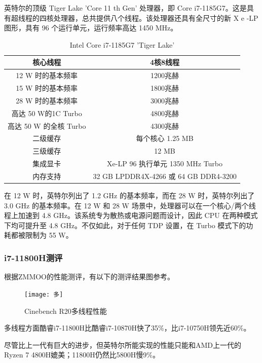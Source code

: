\documentclass[a4paper]{article}
\begin{document}
英特尔的顶级 Tiger Lake 'Core 11 th Gen' 处理器，即 Core i7-1185G7。这是具有超线程的四核处理器，总共提供八个线程。该处理器还具有全尺寸的新 X e -LP 图形，具有 96 个运行单元，运行频率高达 1450 MHz。
\begin{table}[!htbp]
\centering
\begin{tabular}{|c|c|}
\hline
核心线程& 4核8线程\\
\hline
12 W 时的基本频率& 	1200兆赫\\
\hline
15 W 时的基本频率& 	1800兆赫\\
\hline
28 W 时的基本频率& 3000兆赫\\
\hline
高达 50 W的1C Turbo & 4800兆赫\\
\hline
高达 50 W 的全核 Turbo& 4300兆赫\\
\hline
二级缓存& 每个核心 1.25 MB\\
\hline
三级缓存& 12 MB\\
\hline
集成显卡& Xe-LP
96 执行单元
1350 MHz Turbo\\
\hline
内存支持& 32 GB LPDDR4X-4266
或
64 GB DDR4-3200\\
\hline
\end{tabular}
\caption{Intel Core i7-1185G7 'Tiger Lake'}
\end{table}

在 12 W 时，英特尔列出了 1.2 GHz 的基本频率，而在 28 W 时，英特尔列出了 3.0 GHz 的基本频率。在 12 W 和 28 W 场景中，处理器可以在一个核心/两个线程上加速到 4.8 GHz。该系统专为散热或电源问题而设计，因此 CPU 在两种模式下均可提升至 4.8 GHz。不仅如此，对于任何 TDP 设置，在 Turbo 模式下的功耗都被限制为 55 W。
\subsubsection{i7-11800H测评}

根据ZMMOO的性能测评，有以下的测评结果图参考。


\begin{figure}[H] %
\centering %
\texttt{[image: 多]} %
\caption{Cinebench R20多线程性能} %
\label{Fig.main2} %
\end{figure}

多线程方面酷睿i7-11800H比酷睿i7-10870H快了35\%，比i7-10750H领先近60\%。

尽管比上一代有巨大的进步，但英特尔所能实现的性能只能和AMD上一代的Ryzen 7 4800H媲美；11800H仍然比5800H慢9\%。
\end{document}
